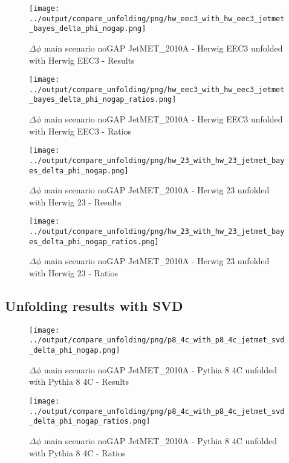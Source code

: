 \documentclass[11pt]{book}
\begin{document}
\begin{figure}[ht]
\centering
\texttt{[image: ../output/compare\_unfolding/png/hw\_eec3\_with\_hw\_eec3\_jetmet\_bayes\_delta\_phi\_nogap.png]}
\caption{$\Delta\phi$ main scenario noGAP JetMET\_2010A - Herwig EEC3 unfolded with Herwig EEC3 - Results}
\label{hw_eec3_hw_eec3_jetmet_bayes_delta_phi_nogap_a}
\end{figure}

\begin{figure}[ht]
\centering
\texttt{[image: ../output/compare\_unfolding/png/hw\_eec3\_with\_hw\_eec3\_jetmet\_bayes\_delta\_phi\_nogap\_ratios.png]}
\caption{$\Delta\phi$ main scenario noGAP JetMET\_2010A - Herwig EEC3 unfolded with Herwig EEC3 - Ratios}
\label{hw_eec3_hw_eec3_jetmet_bayes_delta_phi_nogap_b}
\end{figure}

\begin{figure}[ht]
\centering
\texttt{[image: ../output/compare\_unfolding/png/hw\_23\_with\_hw\_23\_jetmet\_bayes\_delta\_phi\_nogap.png]}
\caption{$\Delta\phi$ main scenario noGAP JetMET\_2010A - Herwig 23 unfolded with Herwig 23 - Results}
\label{hw_23_hw_23_jetmet_bayes_delta_phi_nogap_a}
\end{figure}

\begin{figure}[ht]
\centering
\texttt{[image: ../output/compare\_unfolding/png/hw\_23\_with\_hw\_23\_jetmet\_bayes\_delta\_phi\_nogap\_ratios.png]}
\caption{$\Delta\phi$ main scenario noGAP JetMET\_2010A - Herwig 23 unfolded with Herwig 23 - Ratios}
\label{hw_23_hw_23_jetmet_bayes_delta_phi_nogap_b}
\end{figure}


\clearpage
\subsection{Unfolding results with SVD}

\begin{figure}[ht]
\centering
\texttt{[image: ../output/compare\_unfolding/png/p8\_4c\_with\_p8\_4c\_jetmet\_svd\_delta\_phi\_nogap.png]}
\caption{$\Delta\phi$ main scenario noGAP JetMET\_2010A - Pythia 8 4C unfolded with Pythia 8 4C - Results}
\label{p8_p8_jetmet_svd_delta_phi_nogap_a}
\end{figure}

\begin{figure}[ht]
\centering
\texttt{[image: ../output/compare\_unfolding/png/p8\_4c\_with\_p8\_4c\_jetmet\_svd\_delta\_phi\_nogap\_ratios.png]}
\caption{$\Delta\phi$ main scenario noGAP JetMET\_2010A - Pythia 8 4C unfolded with Pythia 8 4C - Ratios}
\label{p8_p8_jetmet_svd_delta_phi_nogap_b}
\end{figure}
\end{document}
